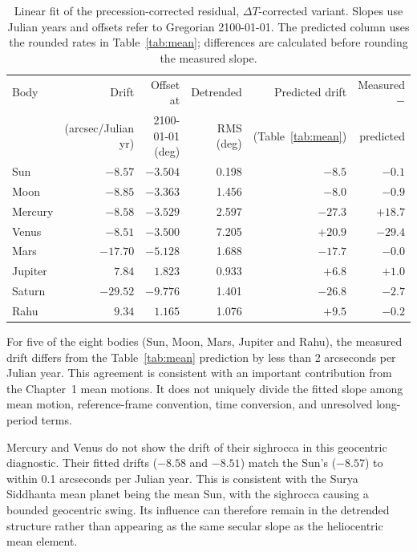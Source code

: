 \documentclass[11pt,a4paper]{article}
\newcommand{\toprule}{\hline\hline}%
\newcommand{\midrule}{\hline}%
\newcommand{\bottomrule}{\hline\hline}}
\newcommand{\dT}{$\Delta T$}
\begin{document}
\begin{table}[htbp]
\centering
\caption{Linear fit of the precession-corrected residual, \dT{}-corrected variant. Slopes use Julian years and offsets refer to Gregorian 2100-01-01. The predicted column uses the rounded rates in Table~\ref{tab:mean}; differences are calculated before rounding the measured slope.}
\label{tab:decomp}
\small
\begin{tabular}{@{}lrrrrr@{}}
\toprule
Body & Drift & Offset at & Detrended & Predicted drift & Measured $-$ \\
     & (arcsec/Julian yr) & 2100-01-01 (deg) & RMS (deg) & (Table~\ref{tab:mean}) & predicted \\
\midrule
Sun     & $-8.57$  & $-3.504$ & 0.198 & $-8.5$  & $-0.1$  \\
Moon    & $-8.85$  & $-3.363$ & 1.456 & $-8.0$  & $-0.9$  \\
Mercury & $-8.58$  & $-3.529$ & 2.597 & $-27.3$ & $+18.7$ \\
Venus   & $-8.51$  & $-3.500$ & 7.205 & $+20.9$ & $-29.4$ \\
Mars    & $-17.70$ & $-5.128$ & 1.688 & $-17.7$ & $-0.0$  \\
Jupiter & $7.84$   & $1.823$  & 0.933 & $+6.8$  & $+1.0$  \\
Saturn  & $-29.52$ & $-9.776$ & 1.401 & $-26.8$ & $-2.7$  \\
Rahu    & $9.34$   & $1.165$  & 1.076 & $+9.5$  & $-0.2$  \\
\bottomrule
\end{tabular}
\end{table}

For five of the eight bodies (Sun, Moon, Mars, Jupiter and Rahu), the measured drift differs from the Table~\ref{tab:mean} prediction by less than 2 arcseconds per Julian year. This agreement is consistent with an important contribution from the Chapter~1 mean motions. It does not uniquely divide the fitted slope among mean motion, reference-frame convention, time conversion, and unresolved long-period terms.

Mercury and Venus do not show the drift of their sighrocca in this geocentric diagnostic. Their fitted drifts ($-8.58$ and $-8.51$) match the Sun's ($-8.57$) to within 0.1 arcseconds per Julian year. This is consistent with the Surya Siddhanta mean planet being the mean Sun, with the sighrocca causing a bounded geocentric swing. Its influence can therefore remain in the detrended structure rather than appearing as the same secular slope as the heliocentric mean element.
\end{document}
